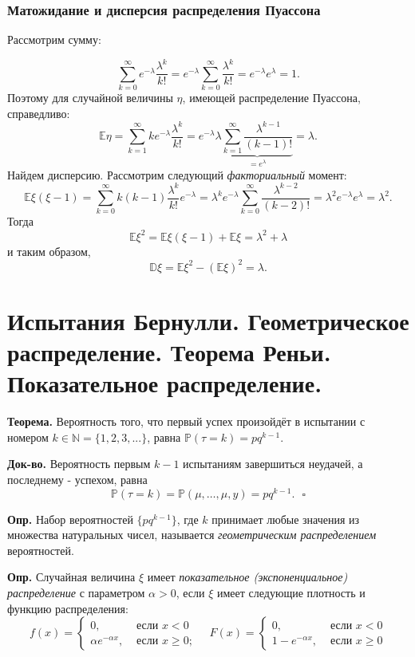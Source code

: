 \documentclass[oneside,final,14pt]{extreport}
\newcommand\mydef{{\bf Опр.}}
\newcommand\myth{{\bf Теорема.}}
\newcommand\myqed{{\bf Док-во.}}
\newcommand\myprob[1]{{\mathbb{P}(#1)}}
\theoremstyle{definition}
\begin{document}
\subsubsection{Матожидание и дисперсия распределения Пуассона}

Рассмотрим сумму:

$$ \sum\limits_{k=0}^{\infty} e^{-\lambda} \frac{\lambda^k}{k!} = e^{-\lambda} \sum\limits_{k=0}^{\infty} \frac{\lambda^k}{k!} = e^{-\lambda} e^\lambda = 1.$$
Поэтому для случайной величины $\eta$, имеющей распределение Пуассона, справедливо:
$$ \mathbb{E}\eta = \sum\limits_{k=1}^{\infty} k e^{-\lambda} \frac{\lambda^k}{k!} = e^{-\lambda} \lambda \underbrace{\sum\limits_{k=1}^{\infty} \frac{\lambda^{k-1}}{(k - 1)!}}_{ = e^\lambda} = \lambda.$$
Найдем дисперсию. Рассмотрим следующий {\it факториальный} момент:
$$ \mathbb{E}\xi(\xi - 1) = \sum\limits_{k=0}^{\infty} k (k - 1) \frac{\lambda^k}{k!} e^{-\lambda}  = \lambda^k e^{-\lambda} \sum\limits_{k=0}^{\infty} \frac{\lambda^{k-2}}{(k-2)!} = \lambda^2 e^{-\lambda} e^\lambda = \lambda^2.$$
Тогда
$$ \mathbb{E}\xi^2 = \mathbb{E}\xi(\xi - 1) + \mathbb{E}\xi = \lambda^2 + \lambda$$
и таким образом, 
$$ \mathbb{D}\xi = \mathbb{E}\xi^2 - (\mathbb{E}\xi)^2 = \lambda.$$


\section {Испытания Бернулли. Геометрическое распределение. Теорема Реньи. Показательное распределение.}

\myth{} Вероятность того, что первый успех произойдёт в испытании с номером $k \in \mathbb{N} = \{1, 2, 3, ...\}$, равна $\myprob{\tau = k} = pq^{k-1}$.

\myqed{} Вероятность первым $k - 1$ испытаниям завершиться неудачей, а последнему - успехом, равна 
$$\mathbb{P}(\tau=k)=\mathbb{P}(\mu, \ldots, \mu, y)=p q^{k-1}. ~~~ \square$$

\mydef{} Набор вероятностей $\{p q^{k-1}\}$, где $k$ принимает любые значения из множества натуральных чисел, называется {\it геометрическим распределением} вероятностей. 

\mydef{} Случайная величина $\xi$ имеет {\it показательное (экспоненциальное) распределение} с параметром $\alpha > 0$, если $\xi$ имеет следующие плотность и функцию распределения:
$$f(x)=\left\{\begin{array}{cc}
0, & \text { если } x<0 \\
\alpha e^{-\alpha x}, & \text { если } x \geqslant 0 ;
\end{array} \quad F(x)=\left\{\begin{array}{cc}
0, & \text { если } x<0 \\
1-e^{-\alpha x}, & \text { если } x \geqslant 0
\end{array}\right.\right.$$
\end{document}
